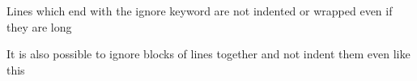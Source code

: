 \documentclass{article}
\begin{document}
Lines which end with the ignore keyword are not indented or wrapped even if they are long %

It is also possible to ignore blocks
  of lines together and not indent them
    even like this



\end{document}
